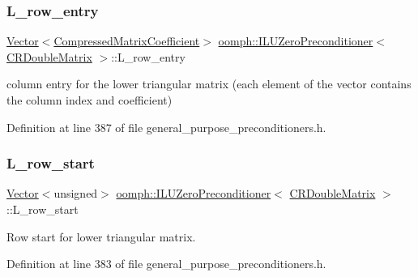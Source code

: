 \subsubsection{\texorpdfstring{L\+\_\+row\+\_\+entry}{L\_row\_entry}}
{\footnotesize\ttfamily \hyperlink{classoomph_1_1Vector}{Vector}$<$\hyperlink{classoomph_1_1CompressedMatrixCoefficient}{Compressed\+Matrix\+Coefficient}$>$ \hyperlink{classoomph_1_1ILUZeroPreconditioner}{oomph\+::\+I\+L\+U\+Zero\+Preconditioner}$<$ \hyperlink{classoomph_1_1CRDoubleMatrix}{C\+R\+Double\+Matrix} $>$\+::L\+\_\+row\+\_\+entry\hspace{0.3cm}{\ttfamily [private]}}



column entry for the lower triangular matrix (each element of the vector contains the column index and coefficient) 



Definition at line 387 of file general\+\_\+purpose\+\_\+preconditioners.\+h.

\mbox{\label{classoomph_1_1ILUZeroPreconditioner_3_01CRDoubleMatrix_01_4_a8d89d3a259a7d8309b467c8cb0b1842c}} 
\subsubsection{\texorpdfstring{L\+\_\+row\+\_\+start}{L\_row\_start}}
{\footnotesize\ttfamily \hyperlink{classoomph_1_1Vector}{Vector}$<$unsigned$>$ \hyperlink{classoomph_1_1ILUZeroPreconditioner}{oomph\+::\+I\+L\+U\+Zero\+Preconditioner}$<$ \hyperlink{classoomph_1_1CRDoubleMatrix}{C\+R\+Double\+Matrix} $>$\+::L\+\_\+row\+\_\+start\hspace{0.3cm}{\ttfamily [private]}}



Row start for lower triangular matrix. 



Definition at line 383 of file general\+\_\+purpose\+\_\+preconditioners.\+h.

\mbox{\label{classoomph_1_1ILUZeroPreconditioner_3_01CRDoubleMatrix_01_4_a459b5704ff4481a0875c36f743e235b0}} 
